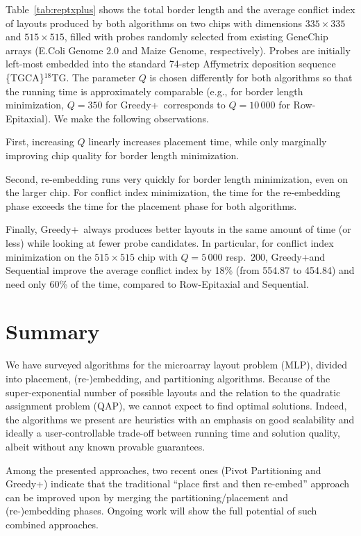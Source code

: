 \documentclass{w-edbk}
\newcommand{\Greedyplus}{Greedy+}
\begin{document}
Table~\ref{tab:reptxplus} shows the total border length and the
average conflict index of layouts produced by both algorithms on two
chips with dimensions $335 \times 335$ and $515 \times 515$, filled
with probes randomly selected from existing GeneChip arrays (E.Coli
Genome 2.0 and Maize Genome, respectively). Probes are initially
left-most embedded into the standard 74-step Affymetrix deposition
sequence \{TGCA\}$^{18}$TG. The parameter $Q$ is chosen differently
for both algorithms so that the running time is approximately
comparable (e.g., for border length minimization, $Q=350$ for
\Greedyplus\ corresponds to $Q=10\,000$ for Row-Epitaxial). We make
the following observations.

First, increasing $Q$ linearly increases placement time, while only
marginally improving chip quality for border length minimization.

Second, re-embedding runs very quickly for border length minimization,
even on the larger chip. For conflict index minimization, the time for
the re-embedding phase exceeds the time for the placement phase for
both algorithms.

Finally, \Greedyplus\ always produces better layouts in the same amount of
time (or less) while looking at fewer probe candidates.  In particular, for
conflict index minimization on the $515\times 515$ chip with $Q=5\,000$ resp.\ 
$200$, \Greedyplus\;and Sequential improve the average conflict index by 18\%
(from 554.87 to 454.84) and need only 60\% of the time, compared to
Row-Epitaxial and Sequential.


\section{Summary}
\label{sec:summary}

We have surveyed algorithms for the microarray layout problem (MLP), divided
into placement, (re-)embedding, and partitioning algorithms.  Because of the
super-exponential number of possible layouts and the relation to the quadratic
assignment problem (QAP), we cannot expect to find optimal solutions. Indeed,
the algorithms we present are heuristics with an emphasis on good scalability
and ideally a user-controllable trade-off between running time and solution
quality, albeit without any known provable guarantees.

Among the presented approaches, two recent ones (Pivot Partitioning and
\Greedyplus) indicate that the traditional ``place first and then re-embed''
approach can be improved upon by merging the partitioning/placement and
(re-)embedding phases. Ongoing work will show the full potential of such
combined approaches.
\end{document}
